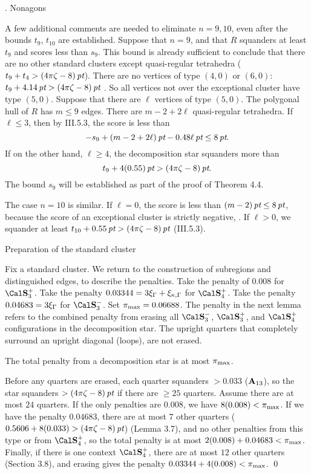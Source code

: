 \subhead {}. Nonagons\endsubhead

A few additional
comments are needed to eliminate $n=9,10$, even after the bounds
$t_9$, $t_{10}$ are established.
Suppose that $n=9$, and that $R$ 
squanders at least $t_9$ and
scores less than $s_9$.  This bound is already sufficient
to conclude that there are no other standard clusters except 
quasi-regular tetrahedra ($t_9+t_4>(4\pi\zeta-8)\,\hbox{\it pt}$).  
There are no vertices of type $(4,0)$ or $(6,0)$:
$t_9+4.14\,\hbox{\it pt}>(4\pi\zeta-8)\,\hbox{\it pt}$ \cite{III.5.2}.   So all vertices not over
the exceptional cluster have type $(5,0)$.
Suppose that there are $\ell$ vertices of type $(5,0)$.
The polygonal hull of $R$ has $m\le 9$ edges.
There are $m-2+2\ell$ quasi-regular tetrahedra.
If $\ell\le 3$, 
then by III.5.3, the score is less than
	$$-s_9+ (m-2+2\ell)\,\hbox{\it pt} -0.48 \ell\,\hbox{\it pt} \le 8\,\hbox{\it pt}.$$
If on the other hand, $\ell\ge 4$, the decomposition star
squanders more than
	$$t_9+ 4(0.55)\,\hbox{\it pt} > (4\pi\zeta-8)\,\hbox{\it pt}.$$
The bound $s_9$ will be established as part of the proof of
Theorem 4.4.

The case $n=10$ is similar.  If $\ell=0$, the score is less than
	$(m-2)\,\hbox{\it pt}\le 8\,\hbox{\it pt}$, because the score of an exceptional cluster
is strictly negative, \cite{F.3.13}.  If $\ell>0$, we squander at
least $t_{10}+ 0.55\,\hbox{\it pt} > (4\pi\zeta-8)\,\hbox{\it pt}$ (III.5.3).

\subhead {} Preparation of the standard cluster\endsubhead

Fix a standard cluster.  We return to the construction of subregions
and distinguished edges, to describe
 the penalties.
 Take the penalty of $0.008$ for $\Splus$.
Take the penalty $0.03344 = 3\xi_\Gamma+\xi_{\kappa,\Gamma}$ for
$\Sfour$.
Take the penalty $0.04683=3\xi_\Gamma$ for $\Sminus$.
Set $\pi_{\max}=0.06688$.  The penalty in the next lemma refers
to the combined penalty from erasing all $\Sminus$, $\Splus$,
and $\Sfour$ configurations in the decomposition star.  The
upright quarters that completely surround an upright diagonal
(loops), are not erased.

The total penalty from a decomposition star is at most
$\pi_{\max}$.
\endproclaim

  Before any quarters are erased, each
quarter squanders $>0.033$ (${\bold A}_{13}$), 
so the star squanders $>(4\pi\zeta-8)\,\hbox{\it pt}$
if there are $\ge25$ quarters.  Assume there are at most $24$ quarters.
If the only penalties are $0.008$, we have $8(0.008)<\pi_{\max}$.
If we have the penalty $0.04683$, there are at most $7$ other
quarters ($0.5606+8(0.033)>(4\pi\zeta-8)\,\hbox{\it pt}$) (Lemma 3.7), 
and no other penalties from this
type or from $\Sfour$, so the total penalty is at most
$2(0.008)+ 0.04683 < \pi_{\max}$.   
  Finally, if there
is one context $\Sfour$, there are at most $12$ other quarters (Section 3.8),
and erasing gives the penalty $0.03344+4 (0.008)<\pi_{\max}$.
\qed
\enddemo

